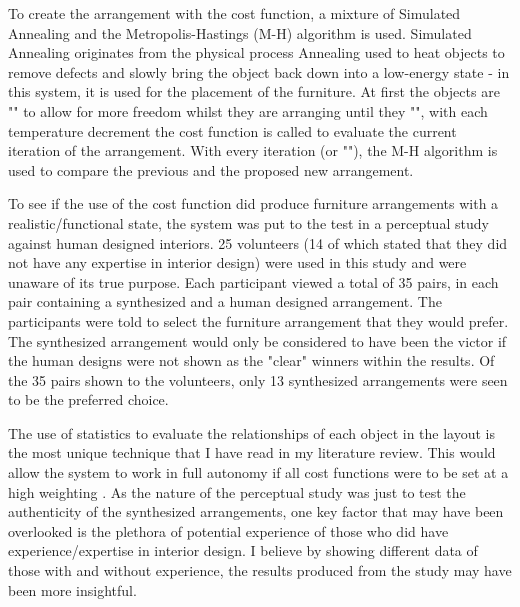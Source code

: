 To create the arrangement with the cost function, a mixture of Simulated Annealing and the Metropolis-Hastings (M-H) algorithm is used. Simulated Annealing originates from the physical process Annealing used to heat objects to remove defects and slowly bring the object back down into a low-energy state \cite{simulated-annealing} - in this system, it is used for the placement of the furniture. At first the objects are "" to allow for more freedom whilst they are arranging until they "", with each temperature decrement the cost function is called to evaluate the current iteration of the arrangement. With every iteration (or ""), the M-H algorithm \cite{understanding-mh-algorithm} is used to compare the previous and the proposed new arrangement.

To see if the use of the cost function did produce furniture arrangements with a realistic/functional state, the system was put to the test in a perceptual study against human designed interiors. 25 volunteers (14 of which stated that they did not have any expertise in interior design) were used in this study and were unaware of its true purpose. Each participant viewed a total of 35 pairs, in each pair containing a synthesized and a human designed arrangement. The participants were told to select the furniture arrangement that they would prefer. The synthesized arrangement would only be considered to have been the victor if the human designs were not shown as the "clear" winners within the results. Of the 35 pairs shown to the volunteers, only 13 synthesized arrangements were seen to be the preferred choice.

The use of statistics to evaluate the relationships of each object in the layout is the most unique technique that I have read in my literature review. This would allow the system to work in full autonomy if all cost functions were to be set at a high weighting \cite{make-it-home}. As the nature of the perceptual study was just to test the authenticity of the synthesized arrangements, one key factor that may have been overlooked is the plethora of potential experience of those who did have experience/expertise in interior design. I believe by showing different data of those with and without experience, the results produced from the study may have been more insightful.

